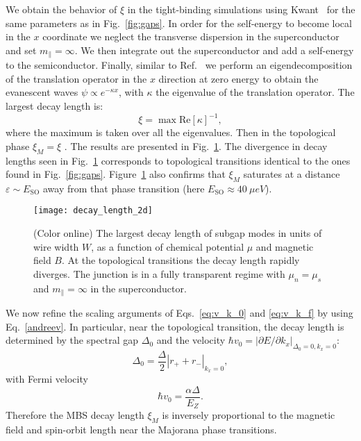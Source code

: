 \documentclass[twocolumn, notitlepage, 10pt, aps, floatfix, showpacs, prb, citeautoscript]{revtex4-1}
\newcommand{\comment}[1]{}
\begin{document}
\comment{The small crossover energy scale is clearly visible in the numerical calculation of $\xi$.}
We obtain the behavior of $\xi$ in the tight-binding simulations using Kwant~\cite{Groth2014} for the same parameters as in Fig.~\ref{fig:gaps}.
In order for the self-energy to become local in the $x$ coordinate we neglect the transverse dispersion in the superconductor and set $m_\parallel = \infty$.
We then integrate out the superconductor and add a self-energy to the semiconductor.
Finally, similar to Ref.~ we perform an eigendecomposition of the translation operator in the $x$ direction at zero energy to obtain the evanescent waves $\psi\propto e^{-\kappa x}$, with $\kappa$ the eigenvalue of the translation operator.
The largest decay length is:
\begin{equation}\label{ximnum}
\xi = \max\mathrm{Re}[\kappa]^{-1},
\end{equation}
where the maximum is taken over all the eigenvalues.
Then in the topological phase $\xi_M = \xi$ .
The results are presented in Fig.~\ref{fig:decay_diag}.
The divergence in decay lengths seen in Fig.~\ref{fig:decay_diag} corresponds to topological transitions identical to the ones found in Fig.~\ref{fig:gaps}.
Figure~\ref{fig:decay_diag} also confirms that $\xi_M$ saturates at a distance $\varepsilon \sim E_\textrm{SO}$ away from that phase transition (here $E_\textrm{SO} \approx\SI{40}{\mu eV}$).

\begin{figure}[t]
\texttt{[image: decay\_length\_2d]}
\caption{(Color online) The largest decay length of subgap modes in units of wire width $W$, as a function of chemical potential $\mu$ and magnetic field $B$.
At the topological transitions the decay length rapidly diverges.
The junction is in a fully transparent regime with $\mu_n=\mu_s$ and $m_\parallel =\infty$ in the superconductor.
}
\label{fig:decay_diag}
\end{figure}

We now refine the scaling arguments of Eqs.~\eqref{eq:v_k_0} and \eqref{eq:v_k_f} by using Eq.~\eqref{andreev}.
In particular, near the topological transition, the decay length is determined by the spectral gap $\Delta_0$ and the velocity $\hbar v_0=|\partial E/\partial k_x|_{\Delta_0=0,k_x=0}$:
\begin{equation}
\Delta_0=\frac{\Delta}{2}|r_++r_-|_{k_x=0},
\end{equation}
with Fermi velocity
\begin{equation}
\hbar v_0=\frac{\alpha\Delta}{E_Z}.
\end{equation}
Therefore the MBS decay length $\xi_M$ is inversely proportional to the magnetic field and spin-orbit length near the Majorana phase transitions.
\end{document}
